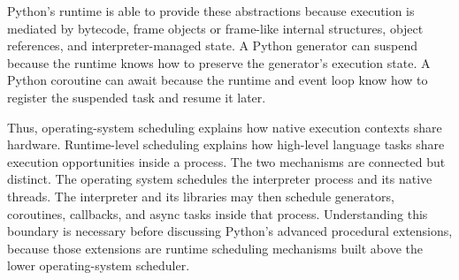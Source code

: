 Python's runtime is able to provide these abstractions because execution is mediated by bytecode, frame objects or frame-like internal structures, object references, and interpreter-managed state. A Python generator can suspend because the runtime knows how to preserve the generator's execution state. A Python coroutine can await because the runtime and event loop know how to register the suspended task and resume it later.

Thus, operating-system scheduling explains how native execution contexts share hardware. Runtime-level scheduling explains how high-level language tasks share execution opportunities inside a process. The two mechanisms are connected but distinct. The operating system schedules the interpreter process and its native threads. The interpreter and its libraries may then schedule generators, coroutines, callbacks, and async tasks inside that process. Understanding this boundary is necessary before discussing Python's advanced procedural extensions, because those extensions are runtime scheduling mechanisms built above the lower operating-system scheduler.